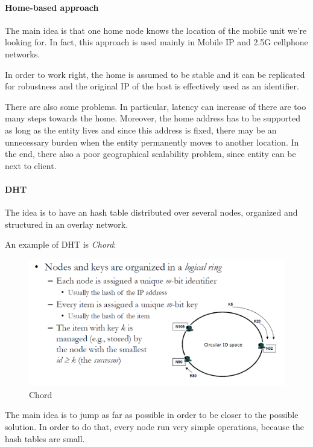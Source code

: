 \paragraph{Home-based approach}\label{home-based-approach}

The main idea is that one home node knows the location of the mobile
unit we're looking for. In fact, this approach is used mainly in Mobile
IP and 2.5G cellphone networks.

In order to work right, the home is assumed to be stable and it can be
replicated for robustness and the original IP of the host is effectively
used as an identifier.

There are also some problems. In particular, latency can increase of
there are too many steps towards the home. Moreover, the home address
has to be supported as long as the entity lives and since this address
is fixed, there may be an unnecessary burden when the entity permanently
moves to another location. In the end, there also a poor geographical
scalability problem, since entity can be next to client.

\paragraph{DHT}\label{dht}

The idea is to have an hash table distributed over several nodes,
organized and structured in an overlay network.

An example of DHT is \emph{Chord}:
\begin{figure}[h]
    \caption{Chord}
    \includegraphics[width=\textwidth]{src/images/naming/dht.png}
    \centering
\end{figure}

The main idea is to jump as far as possible in order to be closer to the
possible solution. In order to do that, every node run very simple
operations, because the hash tables are small.

